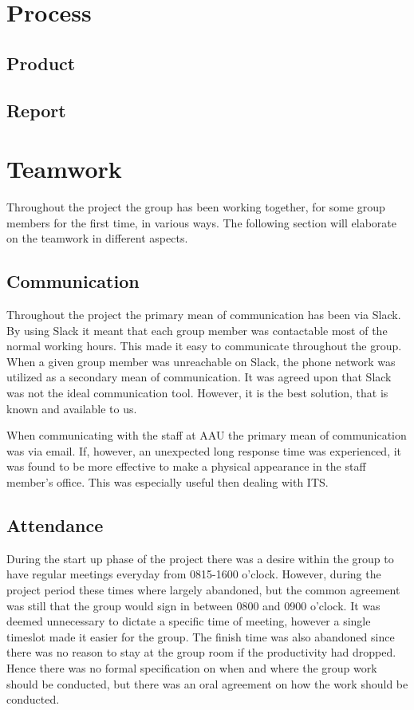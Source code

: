 \section{Process}

\subsection{Product}

\subsection{Report}

\section{Teamwork}
Throughout the project the group has been working together, for some group members for the first time, in various ways. 
The following section will elaborate on the teamwork in different aspects. 

\subsection{Communication}
Throughout the project the primary mean of communication has been via Slack. 
By using Slack it meant that each group member was contactable most of the normal working hours.
This made it easy to communicate throughout the group. 
When a given group member was unreachable on Slack, the phone network was utilized as a secondary mean of communication.
It was agreed upon that Slack was not the ideal communication tool. 
However, it is the best solution, that is known and available to us.

When communicating with the staff at AAU the primary mean of communication was via email.
If, however, an unexpected long response time was experienced, it was found to be more effective to make a physical appearance in the staff member's office.
This was especially useful then dealing with ITS.

\subsection{Attendance}
During the start up phase of the project there was a desire within the group to have regular meetings everyday from 0815-1600 o'clock.
However, during the project period these times where largely abandoned, but the common agreement was still that the group would sign in between 0800 and 0900 o'clock.
It was deemed unnecessary to dictate a specific time of meeting, however a single timeslot made it easier for the group. 
The finish time was also abandoned since there was no reason to stay at the group room if the productivity had dropped.
Hence there was no formal specification on when and where the group work should be conducted, but there was an oral agreement on how the work should be conducted.
